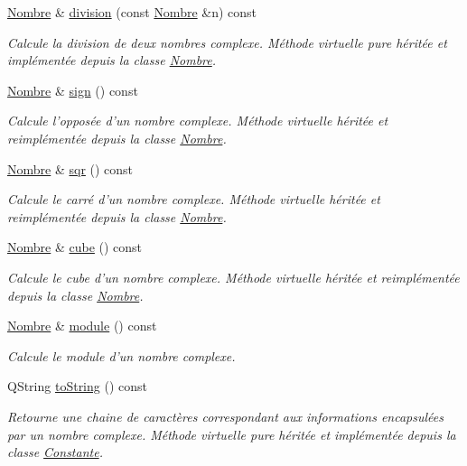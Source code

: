 \begin{DoxyCompactItemize}
\hyperlink{classNombre}{\-Nombre} \& \hyperlink{classComplexe_aad8b6ff92139b04c7357a0e566926a20}{division} (const \hyperlink{classNombre}{\-Nombre} \&n) const 
\begin{DoxyCompactList}\small\item\em \-Calcule la division de deux nombres complexe. \-Méthode virtuelle pure héritée et implémentée depuis la classe \hyperlink{classNombre}{\-Nombre}. \end{DoxyCompactList}\item 
\hyperlink{classNombre}{\-Nombre} \& \hyperlink{classComplexe_ae22fa4e15e4d048c6094ae266b6a750e}{sign} () const 
\begin{DoxyCompactList}\small\item\em \-Calcule l'opposée d'un nombre complexe. \-Méthode virtuelle héritée et reimplémentée depuis la classe \hyperlink{classNombre}{\-Nombre}. \end{DoxyCompactList}\item 
\hyperlink{classNombre}{\-Nombre} \& \hyperlink{classComplexe_a4d7ad8bc647f9c3067a0093619f609c0}{sqr} () const 
\begin{DoxyCompactList}\small\item\em \-Calcule le carré d'un nombre complexe. \-Méthode virtuelle héritée et reimplémentée depuis la classe \hyperlink{classNombre}{\-Nombre}. \end{DoxyCompactList}\item 
\hyperlink{classNombre}{\-Nombre} \& \hyperlink{classComplexe_a1f1f8bb3f3c98b55ed934b0c8695bf2f}{cube} () const 
\begin{DoxyCompactList}\small\item\em \-Calcule le cube d'un nombre complexe. \-Méthode virtuelle héritée et reimplémentée depuis la classe \hyperlink{classNombre}{\-Nombre}. \end{DoxyCompactList}\item 
\hyperlink{classNombre}{\-Nombre} \& \hyperlink{classComplexe_a868e620eb3a7cea74b7111254dfd6101}{module} () const 
\begin{DoxyCompactList}\small\item\em \-Calcule le module d'un nombre complexe. \end{DoxyCompactList}\item 
\-Q\-String \hyperlink{classComplexe_a327fd83ec9743fb43c5d47831d8ed45c}{to\-String} () const 
\begin{DoxyCompactList}\small\item\em \-Retourne une chaine de caractères correspondant aux informations encapsulées par un nombre complexe. \-Méthode virtuelle pure héritée et implémentée depuis la classe \hyperlink{classConstante}{\-Constante}. \end{DoxyCompactList}\item 

\end{DoxyCompactItemize}
